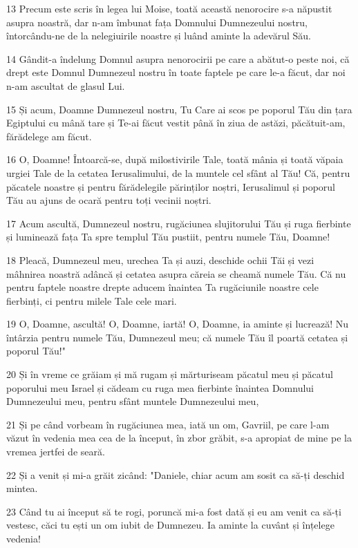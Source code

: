 \par 13 Precum este scris în legea lui Moise, toată această nenorocire s-a năpustit asupra noastră, dar n-am îmbunat fața Domnului Dumnezeului nostru, întorcându-ne de la nelegiuirile noastre și luând aminte la adevărul Său.
\par 14 Gândit-a îndelung Domnul asupra nenorocirii pe care a abătut-o peste noi, că drept este Domnul Dumnezeul nostru în toate faptele pe care le-a făcut, dar noi n-am ascultat de glasul Lui.
\par 15 Și acum, Doamne Dumnezeul nostru, Tu Care ai scos pe poporul Tău din țara Egiptului cu mână tare și Te-ai făcut vestit până în ziua de astăzi, păcătuit-am, fărădelege am făcut.
\par 16 O, Doamne! Întoarcă-se, după milostivirile Tale, toată mânia și toată văpaia urgiei Tale de la cetatea Ierusalimului, de la muntele cel sfânt al Tău! Că, pentru păcatele noastre și pentru fărădelegile părinților noștri, Ierusalimul și poporul Tău au ajuns de ocară pentru toți vecinii noștri.
\par 17 Acum ascultă, Dumnezeul nostru, rugăciunea slujitorului Tău și ruga fierbinte și luminează fața Ta spre templul Tău pustiit, pentru numele Tău, Doamne!
\par 18 Pleacă, Dumnezeul meu, urechea Ta și auzi, deschide ochii Tăi și vezi mâhnirea noastră adâncă și cetatea asupra căreia se cheamă numele Tău. Că nu pentru faptele noastre drepte aducem înaintea Ta rugăciunile noastre cele fierbinți, ci pentru milele Tale cele mari.
\par 19 O, Doamne, ascultă! O, Doamne, iartă! O, Doamne, ia aminte și lucrează! Nu întârzia pentru numele Tău, Dumnezeul meu; că numele Tău îl poartă cetatea și poporul Tău!"
\par 20 Și în vreme ce grăiam și mă rugam și mărturiseam păcatul meu și păcatul poporului meu Israel și cădeam cu ruga mea fierbinte înaintea Domnului Dumnezeului meu, pentru sfânt muntele Dumnezeului meu,
\par 21 Și pe când vorbeam în rugăciunea mea, iată un om, Gavriil, pe care l-am văzut în vedenia mea cea de la început, în zbor grăbit, s-a apropiat de mine pe la vremea jertfei de seară.
\par 22 Și a venit și mi-a grăit zicând: "Daniele, chiar acum am sosit ca să-ți deschid mintea.
\par 23 Când tu ai început să te rogi, poruncă mi-a fost dată și eu am venit ca să-ți vestesc, căci tu ești un om iubit de Dumnezeu. Ia aminte la cuvânt și înțelege vedenia!
